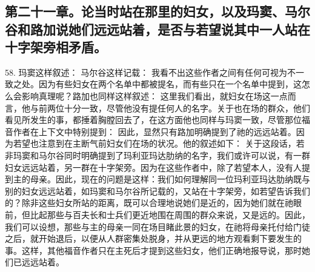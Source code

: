 
\section{}


\subsection{第二十一章。论当时站在那里的妇女，以及玛窦、马尔谷和路加说她们远远站着，是否与若望说其中一人站在十字架旁相矛盾。}

58. 玛窦这样叙述： 马尔谷这样记载： 我看不出这些作者之间有任何可视为不一致之处。因为有些妇女在两个名单中都被提名，而有些只在一个名单中提到，这怎么会影响真理呢？路加也同样这样叙述： 这里我们看出，就妇女在场这一点而言，他与前两位十分一致，尽管他没有提任何人的名字。关于也在场的群众，他们看见所发生的事，都捶着胸膛回去了，在这方面他也同样与玛窦一致，尽管那位福音作者在上下文中特别提到： 因此，显然只有路加明确提到了祂的远远站着。因为若望也注意到在主断气前妇女们在场的状况。他的叙述如下： 关于这段话，若非玛窦和马尔谷同时明确提到了玛利亚玛达肋纳的名字，我们或许可以说，有一群妇女远远站着，另一群在十字架旁。因为在这些作者中，除了若望本人，没有人提到主的母亲。因此，现在的问题是这样：我们如何理解同一位玛利亚玛达肋纳既与别的妇女远远站着，如玛窦和马尔谷所记载的，又站在十字架旁，如若望告诉我们的？除非这些妇女所站的距离，既可以合理地说她们是近的，因为她们就在祂眼前，但比起那些与百夫长和士兵们更近地围在周围的群众来说，又是远的。因此，我们可以设想，那些与主的母亲一同在场目睹此景的妇女，在祂将母亲托付给门徒之后，就开始退后，以便从人群密集处脱身，并从更远的地方观看剩下要发生的事。这样，其他福音作者只在主死后才提到这些妇女，他们正确地报导说，那时她们已远远站着。\par

